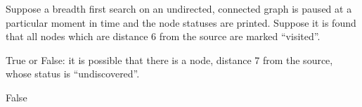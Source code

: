 \begin{prob}

    Suppose a breadth first search on an undirected, connected graph is paused
    at a particular moment in time and the node statuses are printed.
    Suppose it is found that all nodes which are distance 6 from the source are marked
    ``visited''.

    True or False: it is possible that there is a node, distance 7 from the source,
    whose status is ``undiscovered''.

    \tF{}

    \begin{soln}
        False
    \end{soln}

\end{prob}
